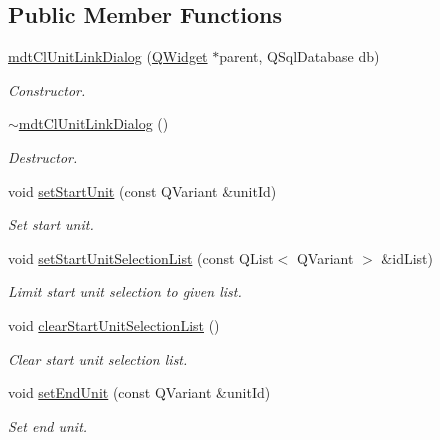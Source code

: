 \subsection*{Public Member Functions}
\begin{DoxyCompactItemize}
\item 
\hyperlink{classmdt_cl_unit_link_dialog_aecb541b458e86006bb5ba8b6d5b6fafb}{mdt\-Cl\-Unit\-Link\-Dialog} (\hyperlink{class_q_widget}{Q\-Widget} $\ast$parent, Q\-Sql\-Database db)
\begin{DoxyCompactList}\small\item\em Constructor. \end{DoxyCompactList}\item 
\hyperlink{classmdt_cl_unit_link_dialog_a0a77f250456330ba367cab406d0312d8}{$\sim$mdt\-Cl\-Unit\-Link\-Dialog} ()
\begin{DoxyCompactList}\small\item\em Destructor. \end{DoxyCompactList}\item 
void \hyperlink{classmdt_cl_unit_link_dialog_afca17028440970a898b9dcd3c1ad6923}{set\-Start\-Unit} (const Q\-Variant \&unit\-Id)
\begin{DoxyCompactList}\small\item\em Set start unit. \end{DoxyCompactList}\item 
void \hyperlink{classmdt_cl_unit_link_dialog_a0d94d403b47dca98652d80af5a7c0ba6}{set\-Start\-Unit\-Selection\-List} (const Q\-List$<$ Q\-Variant $>$ \&id\-List)
\begin{DoxyCompactList}\small\item\em Limit start unit selection to given list. \end{DoxyCompactList}\item 
void \hyperlink{classmdt_cl_unit_link_dialog_ae0225a00bae8b719bee96cfaf0b5d6ce}{clear\-Start\-Unit\-Selection\-List} ()
\begin{DoxyCompactList}\small\item\em Clear start unit selection list. \end{DoxyCompactList}\item 
void \hyperlink{classmdt_cl_unit_link_dialog_a53c0fc3dd8a4134acd185d91e92f0f83}{set\-End\-Unit} (const Q\-Variant \&unit\-Id)
\begin{DoxyCompactList}\small\item\em Set end unit. \end{DoxyCompactList}\item 

\end{DoxyCompactItemize}
